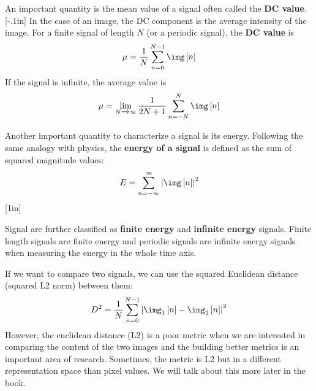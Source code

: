 An important quantity is the mean value of a signal often called the {\bf DC value}.
[-.1in]
In the case of an image, the DC component is the average intensity of the image. For a finite signal of length $N$ (or a periodic signal), the {\bf DC value} is
\begin{equation}
	\mu = \frac{1}{N} \sum_{n=0}^{N-1} \img \left[n\right]
\end{equation}
If the signal is infinite, the average value is
\begin{equation}
	\mu = \lim_{N \xrightarrow{} \infty} \frac{1}{2N+1} \sum_{n=-N}^{N} \img \left[n\right]
\end{equation}


Another important quantity to characterize a signal is its energy. Following the same analogy with physics, the {\bf energy of a signal}
is defined as the sum of squared magnitude values:
\begin{equation}
	E = \sum_{n = -\infty}^{\infty} \left| \img  \left[n\right] \right| ^2
\end{equation}
[1in]

Signal are further classified as {\bf finite energy} and {\bf infinite energy} signals.
Finite length signals are finite energy and periodic signals are infinite energy signals when measuring the energy in the whole time axis.

If we want to compare two signals, we can use the squared Euclidean distance (squared L2 norm) between them:
\begin{equation}
	D^2 = \frac{1}{N} \sum_{n=0}^{N-1} \left| \img_1 \left[n\right] - \img_2 \left[n\right] \right| ^2
\end{equation}
However, the euclidean distance (L2) is a poor metric when we are interested in comparing the content of the two images and the building better metrics is an important area of research. Sometimes, the metric is L2 but in a different representation space than pixel values. We will talk about this more later in the book.

